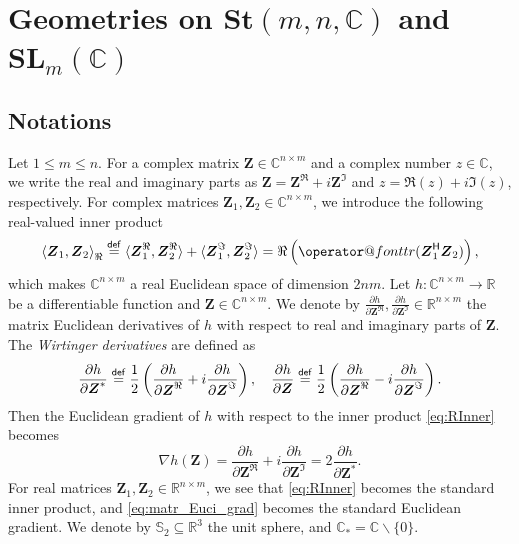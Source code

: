 \documentclass[final,onefignum,onetabnum]{siamart190516}
\makeatletter
\newcommand{\matr}[1]{\boldsymbol{#1}}
\renewcommand{\H}{{\sf H}} %
\newcommand{\trace}[1]{\mathop{\operator@font tr}(#1)}
\newcommand{\eqdef}{\stackrel{\sf def}{=}}
\newcommand{\RR}{\mathbb{R}}
\newcommand{\CC}{\mathbb{C}}
\newcommand{\R}{\Re}
\newcommand{\I}{\Im}
\newcommand{\RInner}[2]{\left\langle #1, #2\right\rangle_{\Re}} %
\renewcommand{\H}{{\sf H}}      %
\newcommand{\SL}{\mathbf{SL}}
\newcommand{\St}{\mathbf{St}}
\newcommand{\ui}{i}
\makeatother
\begin{document}
\section{Geometries on $\St(m,n,\CC)$ and $\SL_{m}(\CC)$}\label{sec:geometr_basics}

\subsection{Notations} 
Let $1\leq m\leq n$. 
For a complex matrix $\matr{Z}\in \CC^{n\times m}$ and a complex number $z\in \CC$, we write the real and imaginary parts as $\matr{Z} =\matr{Z}^{\R} + \ui \matr{Z}^{\I}$ and $z=\R(z)+\ui\I(z)$, respectively. 
For complex matrices $\matr{Z}_1,\matr{Z}_2\in \CC^{n\times m}$, we introduce the following real-valued inner product
\begin{equation}\label{eq:RInner}
\RInner{\matr{Z}_1}{\matr{Z}_2} \eqdef 
\langle\matr{Z}_1^{\R},\matr{Z}_2^{\R} \rangle + \langle\matr{Z}_1^{\I},\matr{Z}_2^{\I} \rangle  =
\Re \left({\trace{\matr{Z}_1^{\H}\matr{Z}_2}}\right),
\end{equation}
which makes $\CC^{n\times m}$ a real Euclidean space  of dimension $2nm$.
Let $h:\CC^{n\times m}\rightarrow\RR$ be a differentiable function and $\matr{Z}\in\CC^{n\times m}$. 
We denote by  $\frac{\partial h}{\partial\matr{Z}^\R},\frac{\partial h}{\partial\matr{Z}^\I} \in \RR^{n\times m}$ the matrix Euclidean derivatives of $h$ with respect to real and imaginary parts of $\matr{Z}$. 
The \emph{Wirtinger derivatives} \cite{abrudan2008steepest,brandwood1983complex,krantz2001function} are defined as
\begin{equation*}
\frac{\partial h}{\partial\matr{Z}^{*}} \eqdef \frac{1}{2}\left(\frac{\partial h}{\partial\matr{Z}^\R}+ \ui\frac{\partial h}{\partial\matr{Z}^\I}\right), \quad 
\frac{\partial h}{\partial\matr{Z}} \eqdef \frac{1}{2}\left(\frac{\partial h}{\partial\matr{Z}^\R}- \ui\frac{\partial h}{\partial\matr{Z}^\I}\right). 
\end{equation*}
Then the Euclidean gradient of $h$ with respect to the inner product \cref{eq:RInner} becomes
\begin{equation}\label{eq:matr_Euci_grad}
\nabla h(\matr{Z}) = \frac{\partial h}{\partial\matr{Z}^\R}+ \ui\frac{\partial h}{\partial\matr{Z}^\I} = 2 \frac{\partial h}{\partial\matr{Z}^{*}}.
\end{equation}
For real matrices $\matr{Z}_1,\matr{Z}_2\in\RR^{n\times m}$, we see that \cref{eq:RInner} becomes the standard inner product, and \cref{eq:matr_Euci_grad} becomes the standard Euclidean gradient. 
We denote by $\mathbb{S}_{2}\subseteq\RR^{3}$ the unit sphere, and $\CC_{*}=\CC\backslash \{0\}$.
\end{document}
